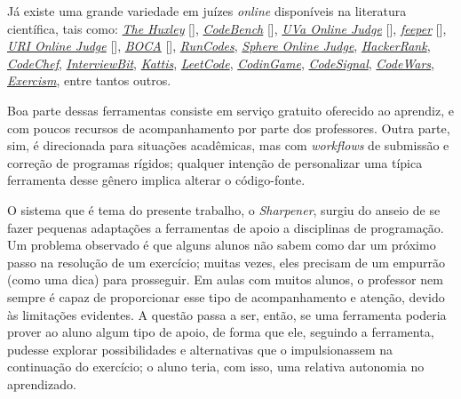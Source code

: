 Já existe uma grande variedade em juízes \emph{online} disponíveis na literatura científica,
tais como: 
\hyperref[link:the_huxley]{\emph{The Huxley}} [], 
	\hyperref[link:code_bench]{\emph{CodeBench}} [],  
	\hyperref[link:uva_judge]{\emph{UVa Online Judge}} [], 
	\hyperref[link:feeper]{\emph{feeper}} [], 
	\hyperref[link:uri_judge]{\emph{URI Online Judge}} [], 
	\hyperref[link:boca]{\emph{BOCA}} [],
	\hyperref[link:we_run_codes]{\emph{RunCodes}},
	\hyperref[link:sphere_judge]{\emph{Sphere Online Judge}},
	\hyperref[link:hacker_rank]{\emph{HackerRank}}, 
	\hyperref[link:code_chef]{\emph{CodeChef}}, 
	\hyperref[link:interview_bit]{\emph{InterviewBit}}, 
	\hyperref[link:kattis]{\emph{Kattis}}, 
	\hyperref[link:leet_code]{\emph{LeetCode}}, 
	\hyperref[link:codin_game]{\emph{CodinGame}}, 
	\hyperref[link:code_signal]{\emph{CodeSignal}}, 
	\hyperref[link:code_wars]{\emph{CodeWars}}, 
	\hyperref[link:exercism]{\emph{Exercism}}, 
	entre tantos outros.

Boa parte dessas ferramentas consiste em serviço gratuito oferecido ao aprendiz,
e com poucos recursos de acompanhamento por parte dos professores.
Outra parte, sim, é direcionada para situações acadêmicas, mas com 
\emph{workflows} de submissão e correção de programas rígidos;
qualquer intenção de personalizar uma típica ferramenta desse gênero
implica alterar o código-fonte.

O sistema que é tema do presente trabalho, o \emph{Sharpener}, surgiu do
anseio de se fazer pequenas adaptações a ferramentas de apoio a disciplinas
de programação.
Um problema observado é que alguns alunos não sabem como dar um próximo passo
na resolução de um exercício;
muitas vezes, eles precisam de um empurrão (como uma dica) para prosseguir.
Em aulas com muitos alunos, o professor nem sempre é capaz de proporcionar
esse tipo de acompanhamento e atenção, devido às limitações evidentes.
A questão passa a ser, então, se uma ferramenta poderia prover ao aluno
algum tipo de apoio, de forma que ele, seguindo a ferramenta, pudesse
explorar possibilidades e alternativas que o impulsionassem na continuação
do exercício; o aluno teria, com isso, uma relativa autonomia no aprendizado.

